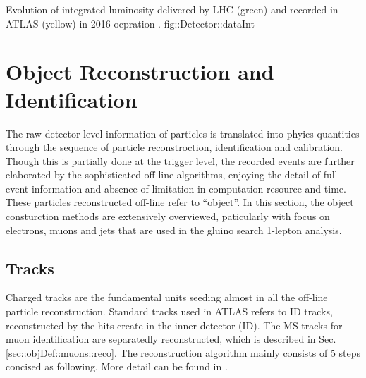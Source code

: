 {Evolution of integrated luminosity delivered by LHC (green) and recorded in ATLAS (yellow) in 2016 oepration \cite{DAQ2016}.}
{fig::Detector::dataInt}

\section{Object Reconstruction and Identification}  \label{sec::objDef}
The raw detector-level information of particles is translated into phyics quantities through the sequence of particle reconstroction, identification and calibration.
Though this is partially done at the trigger level, the recorded events are further elaborated by the sophisticated off-line algorithms, enjoying the detail of full event information and absence of limitation in computation resource and time.
These particles reconstructed off-line refer to ``object''. In this section, the object consturction methods are extensively overviewed, paticularly with focus on electrons, muons and jets that are used in the gluino search 1-lepton analysis.



\subsection{Tracks} \label{sec::objDef::tracks}
Charged tracks are the fundamental units seeding almost in all the off-line particle reconstruction. 
Standard tracks used in ATLAS refers to ID tracks, reconstructed by the hits create in the inner detector (ID).
The MS tracks for muon identification are separatedly reconstructed, which is described in Sec. \ref{sec::objDef::muons::reco}.
The reconstruction algorithm mainly consists of 5 steps concised as following. 
More detail can be found in \cite{130_trackingRun2}.



